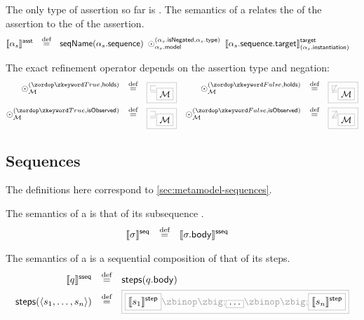 \begin{defn}[\massertion]

\newcommand{\refop}[3]{\mathbin{\odot_{#1}^{(#2, #3)}}}

The only type of assertion so far is \msequenceassertion.  The semantics of a
\msequenceassertion{} relates the \msequence{} of the assertion to the
\mtarget{} of the assertion.
%
\begin{align*}
	\asstsema{\asasst}
\quad\defeq\quad&
	\seqnameOf{\field{\asasst}{sequence}}
	\;
	\refop{\field{\asasst}{model}}{\field{\asasst}{isNegated}}{\field{\asasst}{type}}
	\;
	\targetsema{\field{\field{\asasst}{sequence}}{target}}{\field{\asasst}{instantiation}}
\end{align*}

The exact refinement operator depends on the assertion type and negation:
%
\begin{align*}
	\refop{\amodel}{\true}{\mathsf{holds}}
\quad\defeq\quad&
	\tlang{\sqsubseteq_{\olang{\amodel}}}
&
	\refop{\amodel}{\false}{\mathsf{holds}}
\quad\defeq\quad&
	\tlang{\not\sqsubseteq_{\olang{\amodel}}}
\\
	\refop{\amodel}{\true}{\mathsf{isObserved}}
\quad\defeq\quad&
	\tlang{\sqsupseteq_{\olang{\amodel}}}
&
	\refop{\amodel}{\false}{\mathsf{isObserved}}
\quad\defeq\quad&
	\tlang{\not\sqsupseteq_{\olang{\amodel}}}
\\
\end{align*}
\end{defn}


\subsection{Sequences}\label{ssec:semantics-tockcsp-sequences}

The definitions here correspond to \cref{sec:metamodel-sequences}.

\begin{defn}[\msequence]

The semantics of a \msequence{} is that of its subsequence
.
%
\begin{align*}
	\llbracket \sigma \rrbracket^{\mathsf{seq}}
\quad\mathbin{\overset{\text{def}}=}\quad&	
	\llbracket \sigma.\mathsf{body} \rrbracket^{\mathsf{sseq}}
\end{align*}

\end{defn}

\begin{defn}[\msubsequence]

The semantics of a \msubsequence{} is a sequential composition of that of its steps.
%
\begin{align*}
	\sseqsema{\asseq}
	\quad\defeq\quad&	
	\funcname{steps}(\field{\asseq}{body})
\\
	\funcname{steps}(\langle \astep_1, \dotsc, \astep_n \rangle)
	\quad\defeq\quad&	
	\tlang{
	\olang{\stepsema{\astep_1}}
	\circseq
	\olang{\dotso}
	\circseq
	\olang{\stepsema{\astep_n}}
	}
\end{align*}

\end{defn}

